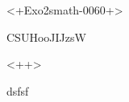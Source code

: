 
\begin{exercice}\label{exo2smath-0060}

<+Exo2smath-0060+>

CSUHooJIJzsW

\begin{center}
   
\end{center}
<++>

dsfsf

\end{exercice}
